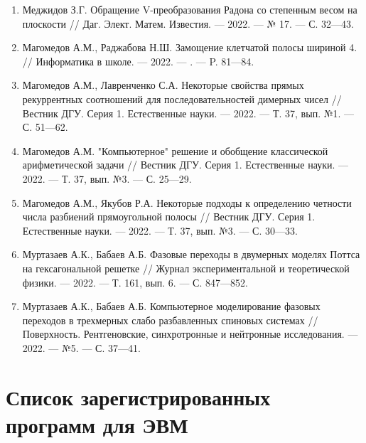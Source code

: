 \begin{enumerate}[1]
    \item
    Меджидов З.Г.
    Обращение V-преобразования Радона со степенным весом на плоскости
    //
    Даг. Элект. Матем. Известия.
    --- 2022.
    --- № 17.
    --- С. 32---43.



    \item
    Магомедов А.М., Раджабова Н.Ш.
    Замощение клетчатой полосы шириной 4.
    //
    Информатика в школе.
    --- 2022.
    --- .
    --- P. 81---84.

    \item
    Магомедов А.М., Лавренченко С.А.
    Некоторые свойства прямых рекуррентных соотношений для последовательностей димерных чисел
    //
    Вестник ДГУ. Серия 1. Естественные науки.
    --- 2022.
    --- Т. 37, вып. №1.
    --- С. 51---62.

    \item
    Магомедов А.М.
    "Компьютерное" решение и обобщение классической арифметической задачи
    //
    Вестник ДГУ. Серия 1. Естественные науки.
    --- 2022.
    --- Т. 37, вып. №3.
    --- С. 25---29.

    \item
    Магомедов А.М., Якубов Р.А.
    Некоторые подходы к определению четности числа разбиений прямоугольной полосы
    //
    Вестник ДГУ. Серия 1. Естественные науки.
    --- 2022.
    --- Т. 37, вып. №3.
    --- С. 30---33.



    \item
    Муртазаев А.К., Бабаев А.Б.
    Фазовые переходы в двумерных моделях Поттса на гексагональной решетке
    //
    Журнал экспериментальной и теоретической физики.
    --- 2022.
    --- Т. 161, вып. 6.
    --- С. 847---852.

    \item
    Муртазаев А.К., Бабаев А.Б.
    Компьютерное моделирование фазовых переходов в трехмерных слабо разбавленных спиновых системах
    //
    Поверхность. Рентгеновские, синхротронные и нейтронные исследования.
    --- 2022.
    --- №5.
    --- С. 37---41.

\end{enumerate}

\section*{Список зарегистрированных программ для ЭВМ}

